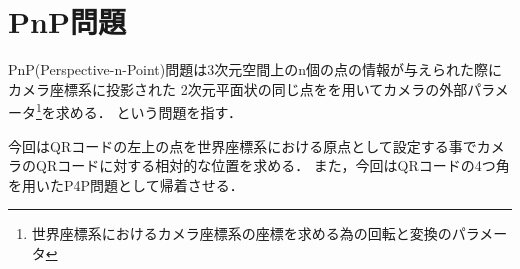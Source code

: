 \section{PnP問題}
PnP(Perspective-n-Point)問題は3次元空間上のn個の点の情報が与えられた際にカメラ座標系に投影された
2次元平面状の同じ点をを用いてカメラの外部パラメータ\footnote{世界座標系におけるカメラ座標系の座標を求める為の回転と変換のパラメータ}を求める．
という問題を指す．

今回はQRコードの左上の点を世界座標系における原点として設定する事でカメラのQRコードに対する相対的な位置を求める．
また，今回はQRコードの4つ角を用いたP4P問題として帰着させる．



